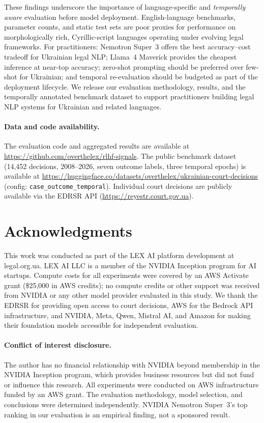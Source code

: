 \documentclass[11pt,a4paper]{article}
\begin{document}
These findings underscore the importance of language-specific and \emph{temporally aware} evaluation before model deployment. English-language benchmarks, parameter counts, and static test sets are poor proxies for performance on morphologically rich, Cyrillic-script languages operating under evolving legal frameworks. For practitioners: Nemotron Super~3 offers the best accuracy--cost tradeoff for Ukrainian legal NLP; Llama~4 Maverick provides the cheapest inference at near-top accuracy; zero-shot prompting should be preferred over few-shot for Ukrainian; and temporal re-evaluation should be budgeted as part of the deployment lifecycle. We release our evaluation methodology, results, and the temporally annotated benchmark dataset to support practitioners building legal NLP systems for Ukrainian and related languages.

\paragraph{Data and code availability.} The evaluation code and aggregated results are available at \url{https://github.com/overthelex/rlhf-signals}. The public benchmark dataset (14,452 decisions, 2008--2026, seven outcome labels, three temporal epochs) is available at \url{https://huggingface.co/datasets/overthelex/ukrainian-court-decisions} (config: \texttt{case\_outcome\_temporal}). Individual court decisions are publicly available via the EDRSR API (\url{https://reyestr.court.gov.ua}).

\section*{Acknowledgments}

This work was conducted as part of the LEX AI platform development at legal.org.ua. LEX AI LLC is a member of the NVIDIA Inception program for AI startups. Compute costs for all experiments were covered by an AWS Activate grant (\$25,000 in AWS credits); no compute credits or other support was received from NVIDIA or any other model provider evaluated in this study. We thank the EDRSR for providing open access to court decisions, AWS for the Bedrock API infrastructure, and NVIDIA, Meta, Qwen, Mistral AI, and Amazon for making their foundation models accessible for independent evaluation.

\paragraph{Conflict of interest disclosure.} The author has no financial relationship with NVIDIA beyond membership in the NVIDIA Inception program, which provides business resources but did not fund or influence this research. All experiments were conducted on AWS infrastructure funded by an AWS grant. The evaluation methodology, model selection, and conclusions were determined independently. NVIDIA Nemotron Super~3's top ranking in our evaluation is an empirical finding, not a sponsored result.
\end{document}
